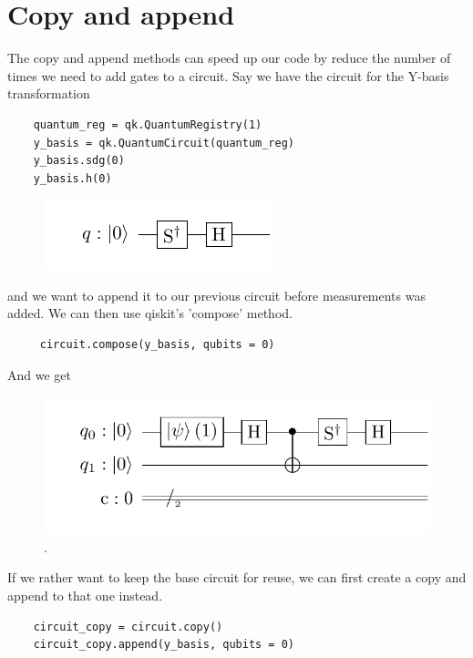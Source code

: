 \section{Copy and append}

The copy and append methods can speed up our code by reduce the number of times we need to add gates to a circuit. Say we have the circuit for the Y-basis transformation

\begin{verbatim}
    quantum_reg = qk.QuantumRegistry(1)
    y_basis = qk.QuantumCircuit(quantum_reg)
    y_basis.sdg(0)
    y_basis.h(0)
\end{verbatim}

\begin{figure}[H]
    \centering
    \includegraphics{Figures/Circuits/implementation/y-basis.pdf}
\end{figure}

and we want to append it to our previous circuit before measurements was added. We can then use qiskit's 'compose' method.

\begin{verbatim}
     circuit.compose(y_basis, qubits = 0)
\end{verbatim}

And we get

\begin{figure}[H]
    \centering
    \includegraphics{Figures/Circuits/implementation/2mesy.pdf}.
\end{figure}

If we rather want to keep the base circuit for reuse, we can first create a copy and append to that one instead.

\begin{verbatim}
    circuit_copy = circuit.copy()
    circuit_copy.append(y_basis, qubits = 0)
\end{verbatim}

